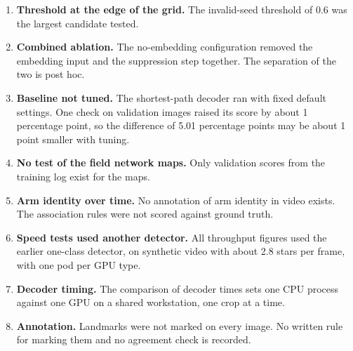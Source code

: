 \begin{enumerate}
\item \textbf{Threshold at the edge of the grid.} The invalid-seed threshold of 0.6 was the largest candidate tested.
\item \textbf{Combined ablation.} The no-embedding configuration removed the embedding input and the suppression step together. The separation of the two is post hoc.
\item \textbf{Baseline not tuned.} The shortest-path decoder ran with fixed default settings. One check on validation images raised its score by about 1 percentage point, so the difference of 5.01 percentage points may be about 1 point smaller with tuning.
\item \textbf{No test of the field network maps.} Only validation scores from the training log exist for the maps.
\item \textbf{Arm identity over time.} No annotation of arm identity in video exists. The association rules were not scored against ground truth.
\item \textbf{Speed tests used another detector.} All throughput figures used the earlier one-class detector, on synthetic video with about 2.8 stars per frame, with one pod per GPU type.
\item \textbf{Decoder timing.} The comparison of decoder times sets one CPU process against one GPU on a shared workstation, one crop at a time.
\item \textbf{Annotation.} Landmarks were not marked on every image. No written rule for marking them and no agreement check is recorded.
\end{enumerate}
